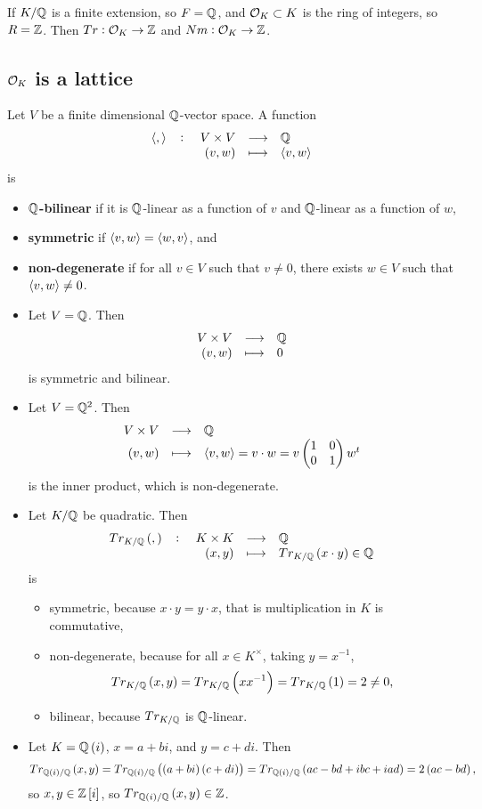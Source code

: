 \begin{corollary}
If $ K / \mathbb{Q} $ is a finite extension, so $ F = \mathbb{Q} $, and $ \mathcal{O}_K \subset K $ is the ring of integers, so $ R = \mathbb{Z} $. Then $ Tr : \mathcal{O}_K \to \mathbb{Z} $ and $ Nm : \mathcal{O}_K \to \mathbb{Z} $.
\end{corollary}

\pagebreak

\subsection{\texorpdfstring{$ \mathcal{O}_K $}{OK} is a lattice}

\begin{definition}
Let $ V $ be a finite dimensional $ \mathbb{Q} $-vector space. A function
$$ \function[\abr{,}]{V \times V}{\Q}{\br{v, w}}{\abr{v, w}} $$
is
\begin{itemize}
\item \textbf{$ \mathbb{Q} $-bilinear} if it is $ \mathbb{Q} $-linear as a function of $ v $ and $ \mathbb{Q} $-linear as a function of $ w $,
\item \textbf{symmetric} if $ \left\langle v, w \right\rangle = \left\langle w, v \right\rangle $, and
\item \textbf{non-degenerate} if for all $ v \in V $ such that $ v \ne 0 $, there exists $ w \in V $ such that $ \left\langle v, w \right\rangle \ne 0 $.
\end{itemize}
\end{definition}

\begin{example*}
\hfill
\begin{itemize}
\item Let $ V = \mathbb{Q} $. Then
$$ \function{V \times V}{\Q}{\br{v, w}}{0} $$
is symmetric and bilinear.
\item Let $ V = \mathbb{Q}^2 $. Then
$$ \function{V \times V}{\Q}{\br{v, w}}{\abr{v, w} = v \cdot w = v\twobytwo{1}{0}{0}{1}w^t} $$
is the inner product, which is non-degenerate.
\item Let $ K / \mathbb{Q} $ be quadratic. Then
$$ \function[Tr_{K / \Q}\br{,}]{K \times K}{\Q}{\br{x, y}}{Tr_{K / \Q}\br{x \cdot y} \in \Q} $$
is
\begin{itemize}
\item symmetric, because $ x \cdot y = y \cdot x $, that is multiplication in $ K $ is commutative,
\item non-degenerate, because for all $ x \in K^\times $, taking $ y = x^{-1} $,
$$ Tr_{K / \Q}\br{x, y} = Tr_{K / \Q}\br{xx^{-1}} = Tr_{K / \Q}\br{1} = 2 \ne 0, $$
\item bilinear, because $ Tr_{K / \mathbb{Q}} $ is $ \mathbb{Q} $-linear.
\end{itemize}
\item Let $ K = \Q\br{i} $, $ x = a + bi $, and $ y = c + di $. Then
$$ Tr_{\Q\br{i} / \Q}\br{x, y} = Tr_{\Q\br{i} / \Q}\br{\br{a + bi}\br{c + di}} = Tr_{\Q\br{i} / \Q}\br{ac - bd + ibc + iad} = 2\br{ac - bd}, $$
so $ x, y \in \Z\sbr{i} $, so $ Tr_{\Q\br{i} / \Q}\br{x, y} \in \Z $.
\end{itemize}
\end{example*}

